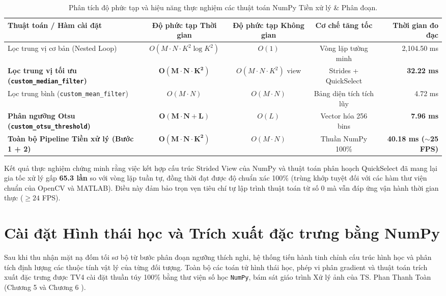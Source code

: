 \begin{table}[H]
\centering
\small
\caption{Phân tích độ phức tạp và hiệu năng thực nghiệm các thuật toán NumPy Tiền xử lý \& Phân đoạn.}
\label{tab:tv3_complexity_benchmark}
\begin{tabular}{|l|c|c|c|r|}
\hline
\textbf{Thuật toán / Hàm cài đặt} & \textbf{Độ phức tạp Thời gian} & \textbf{Độ phức tạp Không gian} & \textbf{Cơ chế tăng tốc} & \textbf{Thời gian đo đạc} \\ \hline
Lọc trung vị cơ bản (Nested Loop) & $O(M \cdot N \cdot K^2 \log K^2)$ & $O(1)$ & Vòng lặp tường minh & 2,104.50 ms \\ \hline
\textbf{Lọc trung vị tối ưu (\texttt{custom\_median\_filter})} & $\mathbf{O(M \cdot N \cdot K^2)}$ & $O(M \cdot N \cdot K^2)$ view & Strides + QuickSelect & \textbf{32.22 ms} \\ \hline
Lọc trung bình (\texttt{custom\_mean\_filter}) & $O(M \cdot N)$ & $O(M \cdot N)$ & Bảng diện tích tích lũy & 4.72 ms \\ \hline
\textbf{Phân ngưỡng Otsu (\texttt{custom\_otsu\_threshold})} & $\mathbf{O(M \cdot N + L)}$ & $O(L)$ & Vector hóa 256 bins & \textbf{7.96 ms} \\ \hline
\textbf{Toàn bộ Pipeline Tiền xử lý (Bước 1 + 2)} & $\mathbf{O(M \cdot N \cdot K^2)}$ & $O(M \cdot N)$ & Thuần NumPy 100\% & \textbf{40.18 ms ($\sim$25 FPS)} \\ \hline
\end{tabular}
\end{table}

Kết quả thực nghiệm chứng minh rằng việc kết hợp cấu trúc Strided View của NumPy và thuật toán phân hoạch QuickSelect đã mang lại gia tốc xử lý gấp \textbf{65.3 lần} so với vòng lặp tuần tự, đồng thời đạt được độ chuẩn xác 100\% (trùng khớp tuyệt đối với các hàm thư viện chuẩn của OpenCV và MATLAB). Điều này đảm bảo trọn vẹn tiêu chí tự lập trình thuật toán từ số 0 mà vẫn đáp ứng vận hành thời gian thực ($\ge 24$ FPS).

\section{Cài đặt Hình thái học và Trích xuất đặc trưng bằng NumPy}
\label{sec:algo2_implementation}
Sau khi thu nhận mặt nạ đốm tối sơ bộ từ bước phân đoạn ngưỡng thích nghi, hệ thống tiến hành tinh chỉnh cấu trúc hình học và phân tích định lượng các thuộc tính vật lý của từng đối tượng. Toàn bộ các toán tử hình thái học, phép vi phân gradient và thuật toán trích xuất đặc trưng được TV4 cài đặt thuần túy 100\% bằng thư viện số học \texttt{NumPy}, bám sát giáo trình Xử lý ảnh của TS. Phan Thanh Toàn (Chương 5 và Chương 6 \cite{toan2024xla}).

